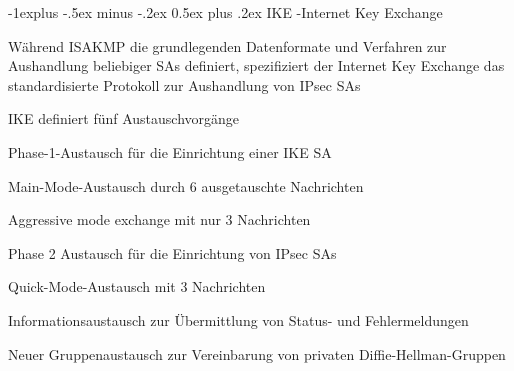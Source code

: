 \documentclass[a4paper]{article}
\makeatletter
\renewcommand{\subsection}{\@startsection{subsection}{2}{0mm}%
 {-1explus -.5ex minus -.2ex}%
 {0.5ex plus .2ex}%
 {\normalfont\normalsize\bfseries}}
\makeatother
\begin{document}
\begin{multicols}{3}
      \subsection{IKE -Internet Key Exchange}
      \begin{itemize*}
            \item Während ISAKMP die grundlegenden Datenformate und Verfahren zur Aushandlung beliebiger SAs definiert, spezifiziert der Internet Key Exchange das standardisierte Protokoll zur Aushandlung von IPsec SAs
            \item IKE definiert fünf Austauschvorgänge
            \begin{enumerate*}
                  \item Phase-1-Austausch für die Einrichtung einer IKE SA
                  \begin{itemize*}
                        \item Main-Mode-Austausch durch 6 ausgetauschte Nachrichten
                        \item Aggressive mode exchange mit nur 3 Nachrichten
                  \end{itemize*}
                  \item Phase 2 Austausch für die Einrichtung von IPsec SAs
                  \begin{itemize*}
                        \item Quick-Mode-Austausch mit 3 Nachrichten
                  \end{itemize*}
                  \item Informationsaustausch zur Übermittlung von Status- und Fehlermeldungen
                  \item Neuer Gruppenaustausch zur Vereinbarung von privaten Diffie-Hellman-Gruppen
            \end{enumerate*}
      \end{itemize*}


\end{multicols}
\end{document}

